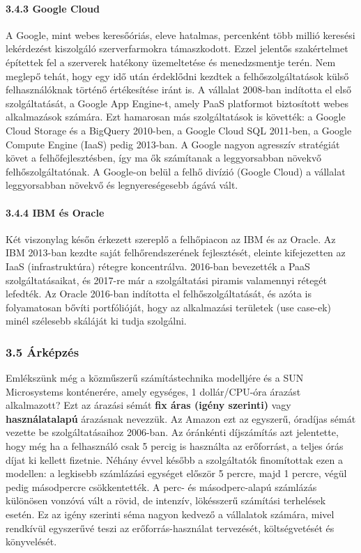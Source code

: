 \documentclass[
]{article}
\begin{document}
\hypertarget{google-cloud}{%
\paragraph{3.4.3 Google Cloud}\label{google-cloud}}

A Google, mint webes keresőóriás, eleve hatalmas, percenként több millió
keresési lekérdezést kiszolgáló szerverfarmokra támaszkodott. Ezzel
jelentős szakértelmet építettek fel a szerverek hatékony üzemeltetése és
menedzsmentje terén. Nem meglepő tehát, hogy egy idő után érdeklődni
kezdtek a felhőszolgáltatások külső felhasználóknak történő értékesítése
iránt is. A vállalat 2008-ban indította el első szolgáltatását, a Google
App Engine-t, amely PaaS platformot biztosított webes alkalmazások
számára. Ezt hamarosan más szolgáltatások is követték: a Google Cloud
Storage és a BigQuery 2010-ben, a Google Cloud SQL 2011-ben, a Google
Compute Engine (IaaS) pedig 2013-ban. A Google nagyon agresszív
stratégiát követ a felhőfejlesztésben, így ma ők számítanak a
leggyorsabban növekvő felhőszolgáltatónak. A Google-on belül a felhő
divízió (Google Cloud) a vállalat leggyorsabban növekvő és
legnyereségesebb ágává vált.

\hypertarget{ibm-uxe9s-oracle}{%
\paragraph{3.4.4 IBM és Oracle}\label{ibm-uxe9s-oracle}}

Két viszonylag későn érkezett szereplő a felhőpiacon az IBM és az
Oracle. Az IBM 2013-ban kezdte saját felhőrendszerének fejlesztését,
eleinte kifejezetten az IaaS (infrastruktúra) rétegre koncentrálva.
2016-ban bevezették a PaaS szolgáltatásaikat, és 2017-re már a
szolgáltatási piramis valamennyi rétegét lefedték. Az Oracle 2016-ban
indította el felhőszolgáltatását, és azóta is folyamatosan bővíti
portfólióját, hogy az alkalmazási területek (use case-ek) minél
szélesebb skáláját ki tudja szolgálni.

\hypertarget{uxe1rkuxe9pzuxe9s}{%
\subsubsection{3.5 Árképzés}\label{uxe1rkuxe9pzuxe9s}}

Emlékszünk még a közműszerű számítástechnika modelljére és a SUN
Microsystems konténerére, amely egységes, 1 dollár/CPU-óra árazást
alkalmazott? Ezt az árazási sémát \textbf{fix áras (igény szerinti)}
vagy \textbf{használatalapú} árazásnak nevezzük. Az Amazon ezt az
egyszerű, óradíjas sémát vezette be szolgáltatásaihoz 2006-ban. Az
óránkénti díjszámítás azt jelentette, hogy még ha a felhasználó csak 5
percig is használta az erőforrást, a teljes órás díjat ki kellett
fizetnie. Néhány évvel később a szolgáltatók finomítottak ezen a
modellen: a legkisebb számlázási egységet először 5 percre, majd 1
percre, végül pedig másodpercre csökkentették. A perc- és
másodperc-alapú számlázás különösen vonzóvá vált a rövid, de intenzív,
lökésszerű számítási terhelések esetén. Ez az igény szerinti séma nagyon
kedvező a vállalatok számára, mivel rendkívül egyszerűvé teszi az
erőforrás-használat tervezését, költségvetését és könyvelését.
\end{document}
